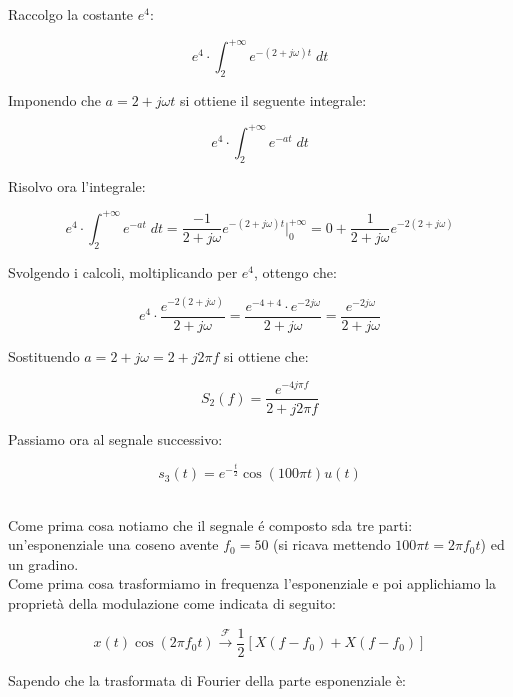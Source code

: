 \documentclass[../main.tex]{subfiles}
\begin{document}
Raccolgo la costante $e^4$:

\begin{equation}
	e^4 \cdot \int_{2}^{+\infty} e^{-(2 + j \omega)t} \;dt
\end{equation}



Imponendo che $ a = 2 + j \omega t $ si ottiene il seguente integrale:

\begin{equation}
	e^4 \cdot \int_{2}^{+\infty} e^{-at} \;dt 
\end{equation}

Risolvo ora l'integrale:

\begin{equation}
	e^4 \cdot \int_{2}^{+\infty} e^{-at} \;dt  = \frac{-1}{2 + j\omega} e^{-(2+j\omega)t}\bigg|_0^{+\infty} = 0 + \frac{1}{2 + j\omega} e ^{-2(2 + j\omega)}
\end{equation}

Svolgendo i calcoli, moltiplicando per $e^4$, ottengo che:

\begin{equation}
	e^4 \cdot \frac{e^{-2(2 + j\omega)}}{2 + j\omega} = \frac{e^{-4+4} \cdot e^{-2j\omega}}{2 + j\omega} = \frac{e^{-2j\omega}}{2 + j\omega}
\end{equation}


Sostituendo $a = 2 + j\omega = 2 + j2\pi f $ si ottiene che:

\begin{equation}
	S_2(f) = \frac{e^{-4j\pi f}}{2 + j2 \pi f}
\end{equation}

Passiamo ora al segnale successivo:

\[s_3(t) = e^{-\frac{t}{2}} \cos(100\pi t) u(t) \]\

Come prima cosa notiamo che il segnale é composto sda tre parti: un'esponenziale una coseno avente $f_0 = 50$ (si ricava mettendo $100\pi t = 2\pi f_0 t $) ed un gradino. \\

Come prima cosa trasformiamo in frequenza l'esponenziale e poi applichiamo la proprietà della modulazione come indicata di seguito:

\begin{equation}
	x(t)\cos(2\pi f_0 t) \xrightarrow{\mathcal{F}} \frac{1}{2} \left[ X(f - f_0) + X(f-f_0) \right]
\end{equation}

Sapendo che la trasformata di Fourier della parte esponenziale è:
\end{document}
